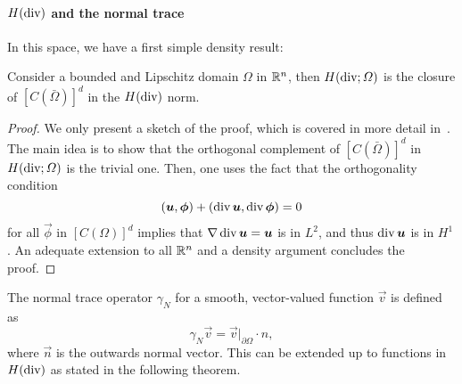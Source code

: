 \paragraph{$H(\operatorname{\text{div}})$ and the normal trace} In this space, we have a first simple density result: 
\begin{theorem}\label{thm:def-Hdiv-closure}
Consider a bounded and Lipschitz domain $\Omega$ in $\mathbb{R}^n$, then $H(\operatorname{\text{div}};\Omega)$ is the closure of $[C(\bar\Omega)]^d$ in the $H(\operatorname{\text{div}})$ norm.
\begin{proof}
We only present a sketch of the proof, which is covered in more detail in~\cite[Theorem 3.22]{monk2003finite}. The main idea is to show that the orthogonal complement of $[C(\bar\Omega)]^d$ in $H(\operatorname{\text{div}};\Omega)$ is the trivial one. Then, one uses the fact that the orthogonality condition 
\begin{equation*}
    (\vec u, \vec \phi) + (\dive \vec u, \dive \vec \phi) = 0
\end{equation*}
for all $\vec\phi$ in $[C(\Omega)]^d$ implies that $\grad \dive\vec u = \vec u$ is in $L^2$, and thus $\dive \vec u$ is in $H^1$. An adequate extension to all $\mathbb{R}^n$ and a density argument concludes the proof.
\end{proof}
\end{theorem}
\begin{definition}\label{def:normal-trace}
    The normal trace operator $\gamma_N$ for a smooth, vector-valued function $\vec v$ is defined as 
    \begin{equation}\label{eq:def-normal-trace}
        \gamma_N \vec v = \vec v|_{\partial\Omega} \cdot n,
    \end{equation}
    where $\vec n $ is the outwards normal vector. This can be extended up to functions in $H(\operatorname{\text{div}})$ as stated in the following theorem.
\end{definition}
